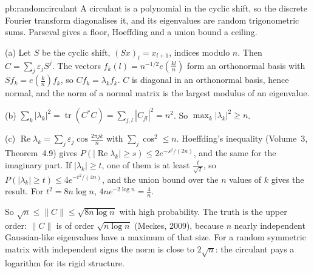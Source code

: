 \begin{solution}{pb:randomcirculant}
\idea A circulant is a polynomial in the cyclic shift, so the discrete Fourier transform diagonalises it, and its eigenvalues are random trigonometric sums. Parseval gives a floor, Hoeffding and a
union bound a ceiling.

\writeup (a) Let $S$ be the cyclic shift, $(Sx)_l=x_{l+1}$, indices modulo $n$. Then $C=\sum_j\varepsilon_jS^j$. The vectors $f_k(l)=n^{-1/2}e(\frac{kl}n)$ form an orthonormal basis with $Sf_k=e(\frac kn)f_k$,
so $Cf_k=\lambda_kf_k$. $C$ is diagonal in an orthonormal basis, hence normal, and the norm of a normal matrix is the largest modulus of an eigenvalue.

(b) $\sum_k|\lambda_k|^2=\operatorname{tr}(C^*C)=\sum_{j,l}|C_{jl}|^2=n^2$. So $\max_k|\lambda_k|^2\ge n$.

(c) $\operatorname{Re}\lambda_k=\sum_j\varepsilon_j\cos\frac{2\pi jk}n$ with $\sum_j\cos^2\le n$. Hoeffding's inequality (Volume~3, Theorem~4.9) gives $P(|\operatorname{Re}\lambda_k|\ge s)\le2e^{-s^2/(2n)}$, and the
same for the imaginary part. If $|\lambda_k|\ge t$, one of them is at least $\frac t{\sqrt2}$, so $P(|\lambda_k|\ge t)\le4e^{-t^2/(4n)}$, and the union bound over the $n$ values of $k$ gives the result.
For $t^2=8n\log n$, $4ne^{-2\log n}=\frac4n$.

\leads So $\sqrt n\le\|C\|\le\sqrt{8n\log n}$ with high probability. The truth is the upper order: $\|C\|$ is of order $\sqrt{n\log n}$ (Meckes, 2009), because $n$ nearly independent Gaussian-like
eigenvalues have a maximum of that size. For a random symmetric matrix with independent signs the norm is close to $2\sqrt n$: the circulant pays a logarithm for its rigid structure.
\end{solution}

